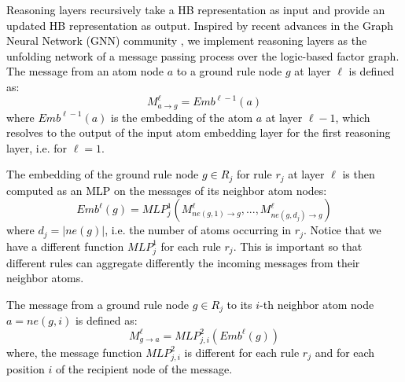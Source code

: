 \documentclass[journal]{IEEEtran}
\newcommand{\ar}[1]{\textcolor{black}{#1}}
\begin{document}
\ar{Reasoning layers recursively take a HB representation as input and provide an updated HB representation as output.}
\ar{Inspired by recent advances in the Graph Neural Network (GNN) community \cite{scarselli2009graph, wu2020comprehensive}, %
we implement reasoning layers as the unfolding network of a message passing process \cite{gilmer2017neural} over the logic-based factor graph. }
\ar{The message  from an atom node $a$ to a ground rule node $g$ at layer $\ell$ is defined as: 
\begin{equation}
    M^{\ell}_{a \rightarrow g} = Emb^{\ell-1}(a)
    \label{eq:message_a_r}
\end{equation}
where $Emb^{\ell-1}(a)$ is the embedding of the atom $a$ at layer $\ell-1$, which resolves to the output of the input atom embedding layer for the first reasoning layer, i.e. for $\ell=1$.}

\ar{The embedding of the ground rule node $g \in R_j$ for rule $r_j$ at layer $\ell$ is then computed as an MLP on the messages of its neighbor atom nodes:
\begin{equation}
    Emb^\ell(g) = MLP^1_{j}( M^\ell_{ne(g,1) \rightarrow g}, ..., M^\ell_{ne(g,d_j) \rightarrow g})
    \label{eq:update_r}
\end{equation}
where $d_j = |ne(g)|$, i.e. the number of atoms occurring in $r_j$.
Notice that we have a different function $MLP^1_j$ for each rule $r_j$. This is important so that different rules can aggregate differently the incoming messages from their neighbor atoms.} 

\ar{The message from a ground rule node $g \in R_j$ to its $i$-th neighbor atom node $a = ne(g,i)$ is defined as:
\begin{equation}
    M_{g \rightarrow a}^\ell = MLP^{2}_{j,i}(Emb^\ell(g))
    \label{eq:message_r_a}
\end{equation}
where, the message function $MLP^{2}_{j,i}$ is different for each rule $r_j$ and for each position $i$ of the recipient node of the message.}
\end{document}
